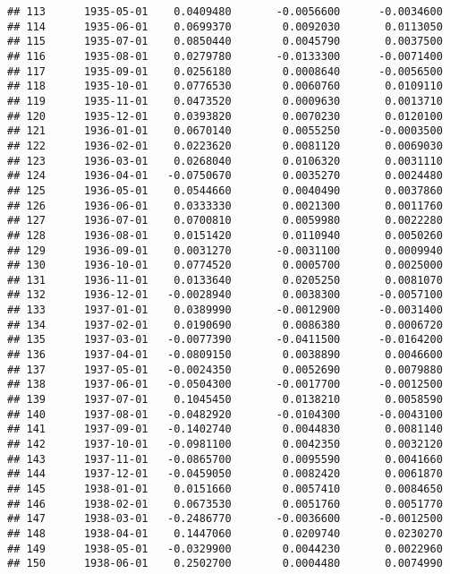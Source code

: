 \documentclass[
]{article}
\begin{document}
\begin{verbatim}
## 113      1935-05-01    0.0409480       -0.0056600      -0.0034600
## 114      1935-06-01    0.0699370        0.0092030       0.0113050
## 115      1935-07-01    0.0850440        0.0045790       0.0037500
## 116      1935-08-01    0.0279780       -0.0133300      -0.0071400
## 117      1935-09-01    0.0256180        0.0008640      -0.0056500
## 118      1935-10-01    0.0776530        0.0060760       0.0109110
## 119      1935-11-01    0.0473520        0.0009630       0.0013710
## 120      1935-12-01    0.0393820        0.0070230       0.0120100
## 121      1936-01-01    0.0670140        0.0055250      -0.0003500
## 122      1936-02-01    0.0223620        0.0081120       0.0069030
## 123      1936-03-01    0.0268040        0.0106320       0.0031110
## 124      1936-04-01   -0.0750670        0.0035270       0.0024480
## 125      1936-05-01    0.0544660        0.0040490       0.0037860
## 126      1936-06-01    0.0333330        0.0021300       0.0011760
## 127      1936-07-01    0.0700810        0.0059980       0.0022280
## 128      1936-08-01    0.0151420        0.0110940       0.0050260
## 129      1936-09-01    0.0031270       -0.0031100       0.0009940
## 130      1936-10-01    0.0774520        0.0005700       0.0025000
## 131      1936-11-01    0.0133640        0.0205250       0.0081070
## 132      1936-12-01   -0.0028940        0.0038300      -0.0057100
## 133      1937-01-01    0.0389990       -0.0012900      -0.0031400
## 134      1937-02-01    0.0190690        0.0086380       0.0006720
## 135      1937-03-01   -0.0077390       -0.0411500      -0.0164200
## 136      1937-04-01   -0.0809150        0.0038890       0.0046600
## 137      1937-05-01   -0.0024350        0.0052690       0.0079880
## 138      1937-06-01   -0.0504300       -0.0017700      -0.0012500
## 139      1937-07-01    0.1045450        0.0138210       0.0058590
## 140      1937-08-01   -0.0482920       -0.0104300      -0.0043100
## 141      1937-09-01   -0.1402740        0.0044830       0.0081140
## 142      1937-10-01   -0.0981100        0.0042350       0.0032120
## 143      1937-11-01   -0.0865700        0.0095590       0.0041660
## 144      1937-12-01   -0.0459050        0.0082420       0.0061870
## 145      1938-01-01    0.0151660        0.0057410       0.0084650
## 146      1938-02-01    0.0673530        0.0051760       0.0051770
## 147      1938-03-01   -0.2486770       -0.0036600      -0.0012500
## 148      1938-04-01    0.1447060        0.0209740       0.0230270
## 149      1938-05-01   -0.0329900        0.0044230       0.0022960
## 150      1938-06-01    0.2502700        0.0004480       0.0074990

\end{verbatim}
\end{document}
